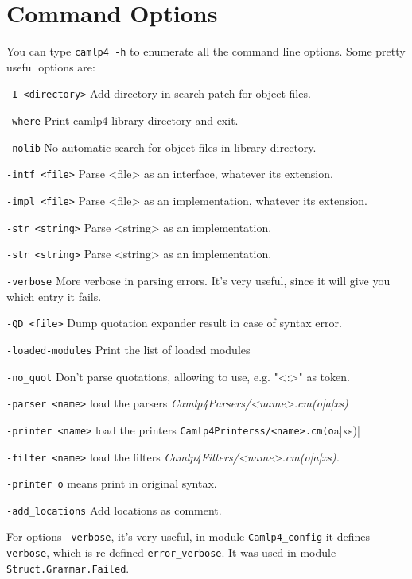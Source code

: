 \section{Command Options}

You can type \verb|camlp4 -h| to enumerate all the command line
options. Some pretty useful options are:

\verb|-I <directory>|
Add directory in search patch for object files.


\verb|-where|
Print camlp4 library directory and exit.


\verb|-nolib|
No automatic search for object files in library directory.


\verb|-intf <file>|
Parse <file> as an interface, whatever its extension.


\verb|-impl <file>|
Parse <file> as an implementation, whatever its extension.


\verb|-str <string>|
Parse <string> as an implementation.


\verb|-str <string>|
Parse <string> as an implementation.


\verb|-verbose|
More verbose in parsing errors. It's very useful, since it will give
you which entry it fails.


\verb|-QD <file>|
Dump quotation expander result in case of syntax error.


\verb|-loaded-modules|
Print the list of loaded modules


\verb|-no_quot|
Don't parse quotations, allowing to use, e.g. "<:>" as token.


\verb|-parser <name>|
load the parsers \textit{Camlp4Parsers/<name>.cm(o|a|xs)}


\verb|-printer <name>|
load the printers \verb|Camlp4Printerss/<name>.cm(o|a|xs)|

\verb|-filter <name>|
load the filters \textit{Camlp4Filters/<name>.cm(o|a|xs).}


\verb|-printer o| means print in original syntax. 

\verb|-add_locations|   Add locations as comment.

For options \verb|-verbose|, it's very useful, in module
\verb|Camlp4_config| it defines \verb|verbose|, which is re-defined
\verb|error_verbose|. It was used in module
\verb|Struct.Grammar.Failed|.

